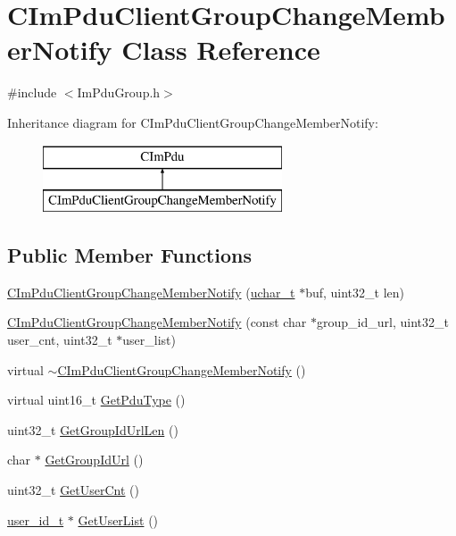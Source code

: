 \hypertarget{class_c_im_pdu_client_group_change_member_notify}{}\section{C\+Im\+Pdu\+Client\+Group\+Change\+Member\+Notify Class Reference}
\label{class_c_im_pdu_client_group_change_member_notify}


{\ttfamily \#include $<$Im\+Pdu\+Group.\+h$>$}

Inheritance diagram for C\+Im\+Pdu\+Client\+Group\+Change\+Member\+Notify\+:\begin{figure}[H]
\begin{center}
\leavevmode
\includegraphics[height=2.000000cm]{class_c_im_pdu_client_group_change_member_notify}
\end{center}
\end{figure}
\subsection*{Public Member Functions}
\begin{DoxyCompactItemize}
\item 
\hyperlink{class_c_im_pdu_client_group_change_member_notify_af481bd5b0a3682f28f95d5ded5b45b07}{C\+Im\+Pdu\+Client\+Group\+Change\+Member\+Notify} (\hyperlink{base_2ostype_8h_a124ea0f8f4a23a0a286b5582137f0b8d}{uchar\+\_\+t} $\ast$buf, uint32\+\_\+t len)
\item 
\hyperlink{class_c_im_pdu_client_group_change_member_notify_ac17ee9b6b62cb857897ef98b75d9b572}{C\+Im\+Pdu\+Client\+Group\+Change\+Member\+Notify} (const char $\ast$group\+\_\+id\+\_\+url, uint32\+\_\+t user\+\_\+cnt, uint32\+\_\+t $\ast$user\+\_\+list)
\item 
virtual \hyperlink{class_c_im_pdu_client_group_change_member_notify_a00e3998e06f4c45affab7a789d7c465f}{$\sim$\+C\+Im\+Pdu\+Client\+Group\+Change\+Member\+Notify} ()
\item 
virtual uint16\+\_\+t \hyperlink{class_c_im_pdu_client_group_change_member_notify_a2df2ef2ed25bd6003381417a35c8e39f}{Get\+Pdu\+Type} ()
\item 
uint32\+\_\+t \hyperlink{class_c_im_pdu_client_group_change_member_notify_a34fdccf7b5e18e74cbb642b86ad6726d}{Get\+Group\+Id\+Url\+Len} ()
\item 
char $\ast$ \hyperlink{class_c_im_pdu_client_group_change_member_notify_a665ad9e9b50a5a10e1ece888cf1a9329}{Get\+Group\+Id\+Url} ()
\item 
uint32\+\_\+t \hyperlink{class_c_im_pdu_client_group_change_member_notify_aa2b887d58f8cc350f6d559d622dda1b2}{Get\+User\+Cnt} ()
\item 
\hyperlink{structuser__id__t}{user\+\_\+id\+\_\+t} $\ast$ \hyperlink{class_c_im_pdu_client_group_change_member_notify_a1a8b9d05d7585d3e7c5483e6dff5fe7e}{Get\+User\+List} ()
\end{DoxyCompactItemize}
